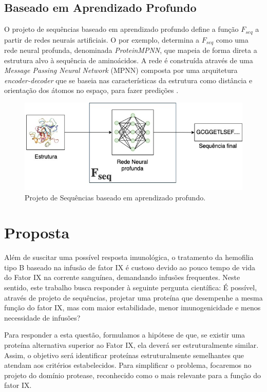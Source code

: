 \subsection{Baseado em Aprendizado Profundo}

O projeto de sequências baseado em aprendizado profundo define a função $F_{seq}$ 
a partir de redes neurais artificiais. 
O \cite{ProteinMPNN} por exemplo, 
determina a $F_{seq}$ como uma rede neural profunda, denominada \textit{ProteinMPNN}, 
que mapeia de forma direta a estrutura alvo à sequência de aminoácidos. 
A rede é construída através de uma \textit{Message Passing Neural Network} (MPNN) 
composta por uma arquitetura \textit{encoder-decoder} 
que se baseia nas características da estrutura como distância e orientação dos átomos no espaço, 
para fazer predições \cite{ProteinMPNN}. 

\begin{figure}[H]
  \centering
  \includegraphics[width=.8\textwidth]{figuras/metodologia-DeepLearningBased.jpg}
  \caption{Projeto de Sequências baseado em aprendizado profundo.}
\end{figure}

\section{Proposta}
\label{section:Proposta}

Além de suscitar uma possível resposta imunológica, 
o tratamento da hemofilia tipo B baseado na infusão de fator IX
é custoso devido ao pouco tempo de vida do Fator IX na corrente sanguínea, demandando infusões frequentes. 
Neste sentido, este trabalho busca responder à seguinte pergunta científica: 
É possível, através de projeto de sequências, projetar uma proteína que desempenhe a mesma função do fator IX, 
mas com maior estabilidade, menor imunogenicidade e menos necessidade de infusões?

Para responder a esta questão, formulamos a hipótese de que, 
se existir uma proteína alternativa superior ao Fator IX, 
ela deverá ser estruturalmente similar. 
Assim, o objetivo será identificar proteínas estruturalmente semelhantes que atendam aos critérios estabelecidos.
Para simplificar o problema, focaremos no projeto do domínio protease, 
reconhecido como o mais relevante para a função do fator IX.


